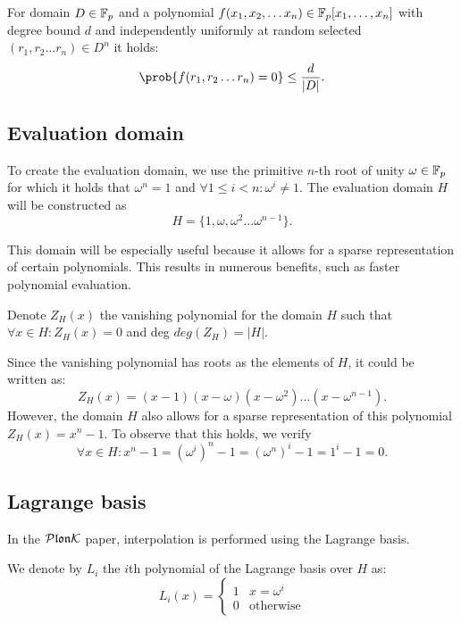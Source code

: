 \begin{lemma}
\label{sz lemma}
    For domain $D \in \mathbb{F}_p$ and a polynomial $f(x_1, x_2, \ldots x_n) \in \mathbb{F}_p[x_1, \ldots, x_n]$ with degree bound $d$ and  independently uniformly at random selected $(r_1, r_2 \ldots r_n) \in D^n$ it holds:
    $$\prob{f(r_1, r_2 \ldots r_n) = 0} \leq \frac{d}{|D|}.$$
\end{lemma}


\subsection{Evaluation domain}
To create the evaluation domain, we use the primitive $n$-th root of unity $\omega \in \mathbb{F}_p$ for which it holds that $\omega^n = 1$ and $\forall 1 \leq i < n: \omega^i \neq 1$. The evaluation domain $H$ will be constructed as $$H = \{1, \omega, \omega^2 \ldots \omega^{n-1}\}.$$

This domain will be especially useful because it allows for a sparse representation of certain polynomials. This results in numerous benefits, such as faster polynomial evaluation.

\begin{definition}
    Denote $Z_H(x)$ the vanishing polynomial for the domain $H$ such that $\forall x \in H: Z_H(x) = 0$ and deg $deg(Z_H) = |H|$.
\end{definition}

Since the vanishing polynomial has roots as the elements of $H$, it could be written as: $$Z_H(x) = (x-1)(x-\omega)(x-\omega^2) \ldots (x-\omega^{n-1}).$$
However, the domain $H$ also allows for a sparse representation of this polynomial $Z_H(x) = x^n-1$. To observe that this holds, we verify $$\forall x \in H: x^n-1 = (\omega^i)^n - 1 = (\omega^n)^i - 1 = 1^i - 1 = 0.$$



    
\subsection{Lagrange basis}
In the $\mathcal{P}\mathfrak{lon}\mathcal{K}$ paper, interpolation is performed using the Lagrange basis.

\begin{definition}
    We denote by $L_i$ the $i$th polynomial of the Lagrange basis over $H$ as:
    $$
    L_i(x) = 
        \begin{cases} 
            1 & x = \omega^i \\
            0 & \text{otherwise}
       \end{cases}
    $$
\end{definition}

